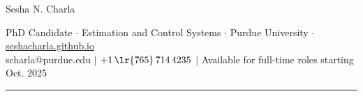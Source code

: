 \documentclass[letterpaper, 10pt]{article}
\begin{document}
\begin{center}
        \huge
        Sesha N. Charla
\end{center}
\begin{center}
        PhD Candidate $\cdot$
        Estimation and Control Systems $\cdot$
        Purdue University $\cdot$
        \href{https://seshacharla.github.io}{seshacharla.github.io}\\
        scharla@purdue.edu $|$
        $+1\,\lr{765}\, 714 \, 4235$
        $|$
        Available for full-time roles starting Oct. 2025
\end{center}

\noindent\rule{\textwidth}{0.4pt}







\end{document}

